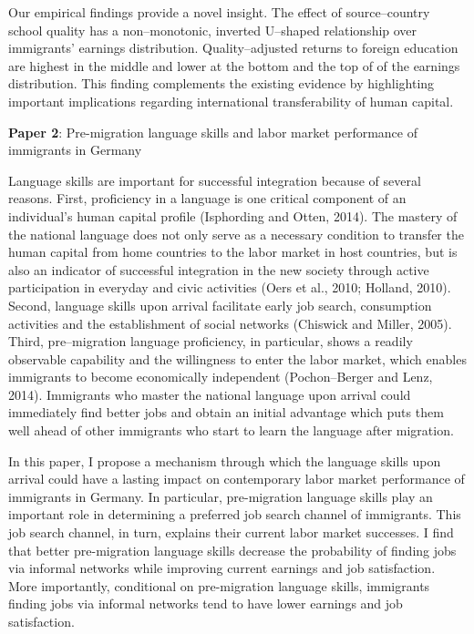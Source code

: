 \documentclass[a4paper, 11pt]{article} %
\begin{document}
Our empirical findings provide a novel insight. The effect of source--country school quality has a non--monotonic, inverted U--shaped relationship over immigrants' earnings distribution. Quality--adjusted returns to foreign education are highest in the middle and lower at the bottom and the top of of the earnings distribution. This finding complements the existing evidence by highlighting important implications regarding international transferability of human capital.

\vspace{15pt}

\textbf{Paper 2}: Pre-migration language skills and labor market performance of immigrants in Germany

\vspace{15pt}

Language skills are important for successful integration because of several reasons. First, proficiency in a language is one critical component of an individual's human capital profile (Isphording and Otten, 2014). The mastery of the national language does not only serve as a necessary condition to transfer the human capital from home countries to the labor market in host countries, but is also an indicator of successful integration in the new society through active participation in everyday and civic activities (Oers et al., 2010; Holland, 2010). Second, language skills upon arrival facilitate early job search, consumption activities and the establishment of social networks (Chiswick and Miller, 2005). Third, pre--migration language proficiency, in particular, shows a readily observable capability and the willingness to enter the labor market, which enables immigrants to become economically independent (Pochon--Berger and Lenz, 2014). Immigrants who master the national language upon arrival could immediately find better jobs and obtain an initial advantage which puts them well ahead of other immigrants who start to learn the language after migration.

In this paper, I propose a mechanism through which the language skills upon arrival could have a lasting impact on contemporary labor market performance of immigrants in Germany. In particular, pre-migration language skills play an important role in determining a preferred job search channel of immigrants. This job search channel, in turn, explains their current labor market successes. I find that better pre-migration language skills decrease the probability of finding jobs via informal networks while improving current earnings and job satisfaction. More importantly, conditional on pre-migration language skills, immigrants finding jobs via informal networks tend to have lower earnings and job satisfaction.
\end{document}
